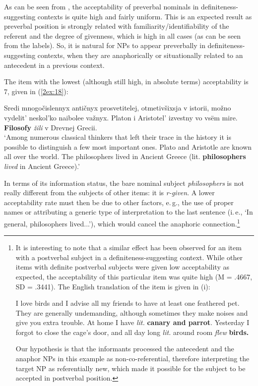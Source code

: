 \documentclass[output=paper]{langsci/langscibook}
\begin{document}
As can be seen from , the acceptability of preverbal nominals in definite\-ness-suggesting contexts is quite high and fairly uniform. This is an expected result as preverbal position is strongly related with familiarity/identifiability of the referent and the degree of givenness, which is high in all cases (as can be seen from the labels). So, it is natural for NPs to appear preverbally in definiteness-suggesting contexts, when they are anaphorically or situationally related to an antecedent in a previous context.

The item with the lowest (although still high, in absolute terms) acceptability is 7, given in (\ref{2ex:18}):

\newpage
\begin{exe}
\ex\label{2ex:18}
Sredi mnogo\v{c}islennyx anti\v{c}nyx prosvetitelej, otmetiv\v{s}ixsja v istorii, mo\v{z}no vydelit' neskol'ko naibolee va\v{z}nyx. 
Platon i Aristotel' izvestny vo vs\"em mire. {\textbf{Filosofy}} {\emph{\v{z}ili}} v Drevnej Grecii. \\
`Among numerous classical thinkers that left their trace in the history it is possible to distinguish a few most important ones. Plato and Aristotle are known all over the world. The philosophers lived in Ancient Greece (lit. {\textbf{philosophers}} {\emph{lived}} in Ancient Greece).'
\end{exe}

In terms of its information status, the bare nominal subject {\emph{philosophers}} is not really different from the subjects of other items: it is {\emph{r-given}}. A lower acceptability rate must then be due to other factors, e.\,g., the use of proper names or attributing a generic type of interpretation to the last sentence (i.\,e., `In general, philosophers lived...'), which would cancel the anaphoric connection.\footnote{It is interesting to note that a similar effect has been observed for an item with a postverbal subject in a definiteness-suggesting context. While other items with definite postverbal subjects were given low acceptability as expected, the acceptability of this particular item was quite high (M = .4667, SD = .3441). The English translation of the item is given in (i):
\begin{exe}
I love birds and I advise all my friends to have at least one feathered pet. They are generally undemanding, although sometimes they make noises and give you extra trouble. At home I have {\emph{lit.}} {\textbf{canary and parrot}}. Yesterday I forgot to close the cage's door, and all day long {\emph{lit.}} around room {\emph{flew}} {\textbf{birds.}}
\end{exe}
\noindent
Our hypothesis is that the informants processed the antecedent and the anaphor NPs in this example as non-co-referential, therefore interpreting the target NP as referentially new, which made it possible for the subject to be accepted in postverbal position.
}
\end{document}
